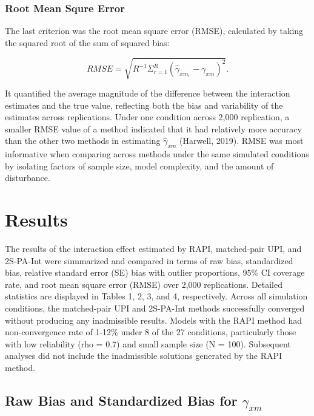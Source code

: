 \documentclass[
  man]{apa6}
\begin{document}
\hypertarget{root-mean-squre-error}{%
\subsubsection{Root Mean Squre Error}\label{root-mean-squre-error}}

The last criterion was the root mean square error (RMSE), calculated by taking the squared root of the sum of squared bias:

\begin{equation}
RMSE = \sqrt{R^{-1}\Sigma^{R}_{r = 1}(\hat{\gamma}_{xm_{r}} - \gamma_{xm})^2}.
\end{equation}

It quantified the average magnitude of the difference between the interaction estimates and the true value, reflecting both the bias and variability of the estimates across replications. Under one condition across 2,000 replication, a smaller RMSE value of a method indicated that it had relatively more accuracy than the other two methods in estimating \(\hat{\gamma}_{xm}\) (Harwell, 2019). RMSE was most informative when comparing across methods under the same simulated conditions by isolating factors of sample size, model complexity, and the amount of disturbance.

\hypertarget{results}{%
\section{Results}\label{results}}

The results of the interaction effect estimated by RAPI, matched-pair UPI, and 2S-PA-Int were summarized and compared in terms of raw bias, standardized bias, relative standard error (SE) bias with outlier proportions, 95\% CI coverage rate, and root mean square error (RMSE) over 2,000 replications. Detailed statistics are displayed in Tables 1, 2, 3, and 4, respectively. Across all simulation conditions, the matched-pair UPI and 2S-PA-Int methods successfully converged without producing any inadmissible results. Models with the RAPI method had non-convergence rate of 1-12\% under 8 of the 27 conditions, particularly those with low reliability (rho = 0.7) and small sample size (N = 100). Subsequent analyses did not include the inadmissible solutions generated by the RAPI method.

\hypertarget{raw-bias-and-standardized-bias-for-gamma_xm}{%
\subsection{\texorpdfstring{Raw Bias and Standardized Bias for \(\gamma_{xm}\)}{Raw Bias and Standardized Bias for \textbackslash gamma\_\{xm\}}}\label{raw-bias-and-standardized-bias-for-gamma_xm}}
\end{document}
